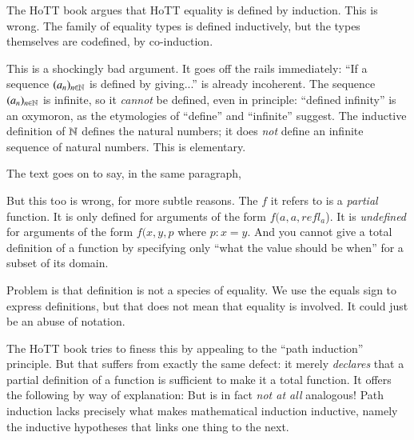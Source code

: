 The HoTT book argues that HoTT equality is defined by induction. This
is wrong. The family of equality types is defined inductively, but the
types themselves are codefined, by co-induction.


This is a shockingly bad argument. It goes off the rails immediately:
\enquote{If a sequence \((a_n)_{n\in\mathbb{N}}\) is defined by giving...}
is already incoherent. The sequence \((a_n)_{n\in\mathbb{N}}\) is infinite,
so it \textit{cannot} be defined, even in principle: ``defined
infinity'' is an oxymoron, as the etymologies of ``define'' and
``infinite'' suggest. The inductive definition of \(\mathbb{N}\) defines the
natural numbers; it does \textit{not} define an infinite sequence of
natural numbers. This is elementary.

The text goes on to say, in the same paragraph, 

But this too is wrong, for more subtle reasons. The \(f\) it refers to
is a \textit{partial} function. It is only defined for arguments of
the form \(f(a,a,refl_a\)). It is \textit{undefined} for arguments of
the form \(f(x,y,p\) where \(p:x=y\). And you cannot give a total
definition of a function by specifying only ``what the value should be
when'' for a subset of its domain.

Problem is that definition is not a species of equality. We use the
equals sign to express definitions, but that does not mean that
equality is involved. It could just be an abuse of notation.

The HoTT book tries to finess this by appealing to the ``path
induction'' principle. But that suffers from exactly the same defect:
it merely \textit{declares} that a partial definition of a function is
sufficient to make it a total function. It offers the following by way
of explanation:  But is in fact \textit{not at all} analogous!
Path induction lacks precisely what makes mathematical induction
inductive, namely the inductive hypotheses that links one thing to the
next.


